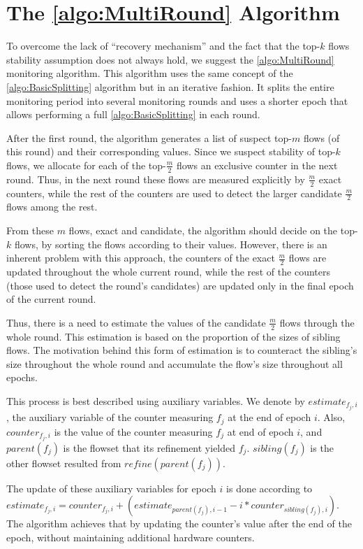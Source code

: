 \section{The \ref{algo:MultiRound} Algorithm}
To overcome the lack of ``recovery mechanism'' and the fact that the top-$k$ flows stability assumption does not always hold, we suggest the \ref{algo:MultiRound} monitoring algorithm.
This algorithm uses the same concept of the \ref{algo:BasicSplitting} algorithm but in an iterative fashion. It splits the entire monitoring period into several monitoring rounds and uses a shorter epoch that allows performing a full \ref{algo:BasicSplitting} in each round.

After the first round, the algorithm generates a list of suspect top-$m$ flows (of this round) and their corresponding values. Since we suspect stability of top-$k$ flows, we allocate for each of the top-$\frac{m}{2}$ flows an exclusive counter in the next round. Thus, in the next round these flows are measured explicitly by $\frac{m}{2}$ exact counters, while the rest of the counters are used to detect the larger candidate $\frac{m}{2}$ flows among the rest.

From these $m$ flows, exact and candidate, the algorithm should decide on the top-$k$ flows, by sorting the flows according to their values.
However, there is an inherent problem with this approach, the counters of the exact $\frac{m}{2}$ flows are updated throughout the whole current round, while the rest of the counters (those used to detect the round's candidates) are updated only in the final epoch of the current round.

Thus, there is a need to estimate the values of the candidate $\frac{m}{2}$ flows through the whole round. This estimation is based on the proportion of the sizes of sibling flows. The motivation behind this form of estimation is to counteract the sibling's size throughout the whole round and accumulate the flow's size throughout all epochs.

This process is best described using auxiliary variables. We denote by $estimate_{f_j, i}$, the auxiliary variable of the counter measuring $f_j$ at the end of epoch $i$. Also, $counter_{f_j,i}$ is the value of the counter measuring $f_j$ at end of epoch $i$, and $parent(f_j)$ is the flowset that its refinement yielded $f_j$. $sibling(f_j)$ is the other flowset resulted from $refine(parent(f_j))$.

The update of these auxiliary variables for epoch $i$ is done according to $estimate_{f_j, i}=counter_{f_j, i} + (estimate_{parent(f_j), i-1} - i*counter_{sibling(f_j), i})$. The algorithm achieves that by updating the counter's value after the end of the epoch, without maintaining additional hardware counters.

